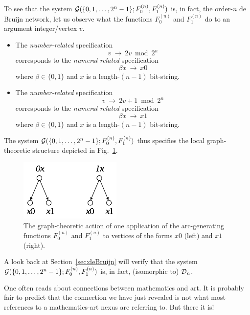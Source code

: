 To see that the system $\mbox{$\cal G$}(\{0, 1, \ldots, 2^n-1\}; F^{(n)}_0, F^{(n)}_1)$ is, in fact, the order-$n$
de Bruijn network, let us observe what the functions $F^{(n)}_0$ and $F^{(n)}_1$ do to an
argument integer/vertex $v$.
\begin{itemize}
\item
The {\em number-related} specification
\[ v \ \longrightarrow \ 2v \bmod 2^n \]
corresponds to the {\em numeral-related} specification
\[ \beta x \ \longrightarrow \ x0 \]
where $\beta \in \{0,1\}$ and $x$ is a length-$(n-1)$ bit-string.

\item
The {\em number-related} specification
\[ v \ \longrightarrow \ 2v+1  \bmod 2^n \]
corresponds to the {\em numeral-related} specification
\[ \beta x \ \longrightarrow \ x1 \]
where $\beta \in \{0,1\}$ and $x$ is a length-$(n-1)$ bit-string.
\end{itemize}
The system $\mbox{$\cal G$}(\{0, 1, \ldots, 2^n-1\}; F^{(n)}_0, F^{(n)}_1)$ thus specifies the local
graph-theoretic structure depicted in Fig.~\ref{fig:one-DB-node}.
\begin{figure}[hbt]
\begin{center}
       \includegraphics[scale=0.5]{FiguresGraph/codingTree2}
\caption{The graph-theoretic action of one application of the arc-generating functions 
$F^{(n)}_0$ and  $F^{(n)}_1$ to vertices of the forms $x0$ (left) and $x1$ (right).}
\label{fig:one-DB-node}
\end{center}
\end{figure}
A look back at Section~\ref{sec:deBruijn} will verify that the system
$\mbox{$\cal G$}(\{0, 1, \ldots, 2^n-1\}; F^{(n)}_0, F^{(n)}_1)$ is, in fact, (isomorphic to) $\mbox{$\cal D$}_n$.

\vspace*{.35in}

One often reads about connections between mathematics and art.  It is probably fair to predict that the connection we have just revealed is not what most references to a mathematics-art nexus are referring to.  But there it is!


